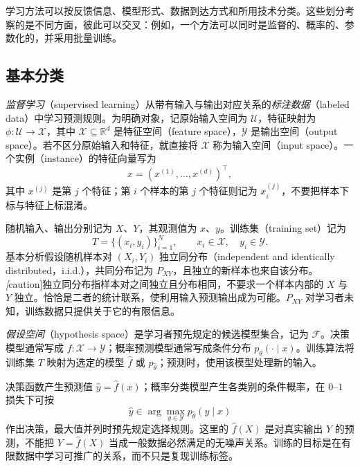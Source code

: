 学习方法可以按反馈信息、模型形式、数据到达方式和所用技术分类。这些划分考察的是不同方面，彼此可以交叉：例如，一个方法可以同时是监督的、概率的、参数化的，并采用批量训练。

\subsection{基本分类}
\label{subsec:lh-basic-categories}

\emph{监督学习}（supervised learning）从带有输入与输出对应关系的\emph{标注数据}（labeled data）中学习预测规则。为明确对象，记原始输入空间为 $\mathcal U$，特征映射为 $\phi:\mathcal U\to\mathcal X$，其中 $\mathcal X\subseteq\mathbb R^d$ 是特征空间（feature space），$\mathcal Y$ 是输出空间（output space）。若不区分原始输入和特征，就直接将 $\mathcal X$ 称为输入空间（input space）。一个实例（instance）的特征向量写为
\[
    x=(x^{(1)},\ldots,x^{(d)})^\top,
\]
其中 $x^{(j)}$ 是第 $j$ 个特征；第 $i$ 个样本的第 $j$ 个特征则记为 $x_i^{(j)}$，不要把样本下标与特征上标混淆。

随机输入、输出分别记为 $X$、$Y$，其观测值为 $x$、$y$。训练集（training set）记为
\begin{equation}
    T=\{(x_i,y_i)\}_{i=1}^N,
    \qquad x_i\in\mathcal X,\quad y_i\in\mathcal Y.
    \label{eq:lh-training-set}
\end{equation}
基本分析假设随机样本对 $(X_i,Y_i)$ 独立同分布（independent and identically distributed，i.i.d.），共同分布记为 $P_{XY}$，且独立的新样本也来自该分布。\emph[caution]{独立同分布指样本对之间独立且分布相同，不要求一个样本内部的 $X$ 与 $Y$ 独立。}恰恰是二者的统计联系，使利用输入预测输出成为可能。$P_{XY}$ 对学习者未知，训练数据只提供关于它的有限信息。

\begin{definition}
\label{def:lh-hypothesis-space}
\emph{假设空间}（hypothesis space）是学习者预先规定的候选模型集合，记为 $\mathcal F$。决策模型通常写成 $f:\mathcal X\to\mathcal Y$；概率预测模型通常写成条件分布 $p_\theta(\cdot\mid x)$。训练算法将训练集 $T$ 映射为选定的模型 $\widehat f$ 或 $p_{\widehat\theta}$；预测时，使用该模型处理新的输入。
\end{definition}

决策函数产生预测值 $\widehat y=\widehat f(x)$；概率分类模型产生各类别的条件概率，在 $0$--$1$ 损失下可按
\[
    \widehat y\in\arg\max_{y\in\mathcal Y}p_{\widehat\theta}(y\mid x)
\]
作出决策，最大值并列时预先规定选择规则。这里的 $\widehat f(X)$ 是对真实输出 $Y$ 的预测，不能把 $Y=\widehat f(X)$ 当成一般数据必然满足的无噪声关系。训练的目标是在有限数据中学习可推广的关系，而不只是复现训练标签。

